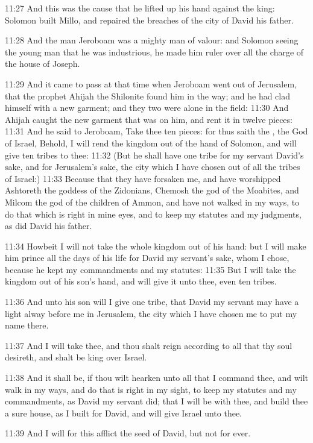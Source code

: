 11:27 And this was the cause that he lifted up his hand against the king: Solomon built Millo, and repaired the breaches of the city of David his father.

11:28 And the man Jeroboam was a mighty man of valour: and Solomon seeing the young man that he was industrious, he made him ruler over all the charge of the house of Joseph.

11:29 And it came to pass at that time when Jeroboam went out of Jerusalem, that the prophet Ahijah the Shilonite found him in the way; and he had clad himself with a new garment; and they two were alone in the field: 11:30 And Ahijah caught the new garment that was on him, and rent it in twelve pieces: 11:31 And he said to Jeroboam, Take thee ten pieces: for thus saith the \LORD, the God of Israel, Behold, I will rend the kingdom out of the hand of Solomon, and will give ten tribes to thee: 11:32 (But he shall have one tribe for my servant David's sake, and for Jerusalem's sake, the city which I have chosen out of all the tribes of Israel:) 11:33 Because that they have forsaken me, and have worshipped Ashtoreth the goddess of the Zidonians, Chemosh the god of the Moabites, and Milcom the god of the children of Ammon, and have not walked in my ways, to do that which is right in mine eyes, and to keep my statutes and my judgments, as did David his father.

11:34 Howbeit I will not take the whole kingdom out of his hand: but I will make him prince all the days of his life for David my servant's sake, whom I chose, because he kept my commandments and my statutes: 11:35 But I will take the kingdom out of his son's hand, and will give it unto thee, even ten tribes.

11:36 And unto his son will I give one tribe, that David my servant may have a light alway before me in Jerusalem, the city which I have chosen me to put my name there.

11:37 And I will take thee, and thou shalt reign according to all that thy soul desireth, and shalt be king over Israel.

11:38 And it shall be, if thou wilt hearken unto all that I command thee, and wilt walk in my ways, and do that is right in my sight, to keep my statutes and my commandments, as David my servant did; that I will be with thee, and build thee a sure house, as I built for David, and will give Israel unto thee.

11:39 And I will for this afflict the seed of David, but not for ever.

